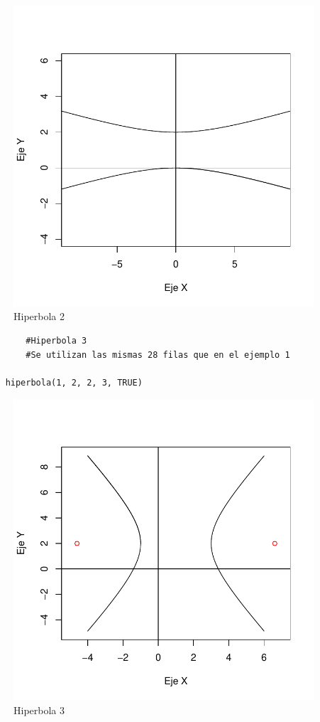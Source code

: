 \documentclass[12pt,a4paper]{article}
\begin{document}
\begin{figure}
\centering
\includegraphics[scale=.8]{HIP2}
\caption{Hiperbola 2}
\label{fig:hiperbola2}
\end{figure}

\begin{table}[htpb]
	\begin{lstlisting}
		#Hiperbola 3		
		#Se utilizan las mismas 28 filas que en el ejemplo 1
		
	hiperbola(1, 2, 2, 3, TRUE)
	\end{lstlisting}
	\caption{Tercer código en R para gráficar la hiperbola de la figura \ref{fig:hiperbola3}.}
	\label{alg:recta2}
\end{table}

\begin{figure}
\centering
\includegraphics[scale=.8]{HIP3}
\caption{Hiperbola 3}
\label{fig:hiperbola3}
\end{figure}



\newpage


\end{document}
